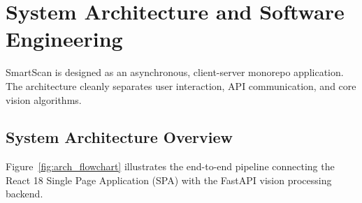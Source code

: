 \documentclass[11pt,a4paper]{article}
\begin{document}
\newpage
\section{System Architecture and Software Engineering}
\label{sec:architecture}

SmartScan is designed as an asynchronous, client-server monorepo application. The architecture cleanly separates user interaction, API communication, and core vision algorithms.

\subsection{System Architecture Overview}
Figure~\ref{fig:arch_flowchart} illustrates the end-to-end pipeline connecting the React 18 Single Page Application (SPA) with the FastAPI vision processing backend.
\end{document}
